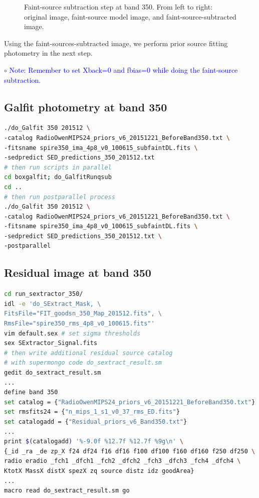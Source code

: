 \documentclass[11pt,a4paper]{article}
\begin{document}
\begin{figure}[H]
	\caption{Faint-source subtraction step at band 350. From left to right: original image, faint-source model image, and faint-source-subtracted image.}
\end{figure}

Using the faint-sources-subtracted image, we perform prior source fitting photometry in the next step. 

\indent\hspace{15pt}$\circ$ 
\textcolor{blue}{Note: Remember to set Xback=0 and fbias=0 while doing the faint-source subtraction.}
\\

\subsection{Galfit photometry at band 350}
\label{Band350_Galfit}

\begin{lstlisting}[language=bash]
./do_Galfit 350 201512 \
-catalog RadioOwenMIPS24_priors_v6_20151221_BeforeBand350.txt \
-fitsname spire350_ima_4p8_v0_100615_subfaintDL.fits \
-sedpredict SED_predictions_350_201512.txt
# then run scripts in parallel 
cd boxgalfit; do_GalfitRunqsub
cd ..
# then run postparallel process
./do_Galfit 350 201512 \
-catalog RadioOwenMIPS24_priors_v6_20151221_BeforeBand350.txt \
-fitsname spire350_ima_4p8_v0_100615_subfaintDL.fits \
-sedpredict SED_predictions_350_201512.txt \
-postparallel
\end{lstlisting}

\subsection{Residual image at band 350}
\label{Band350_Galres}

\begin{lstlisting}[language=bash]
cd run_sextractor_350/
idl -e 'do_SExtract_Mask, \
FitsFile="FIT_goodsn_350_Map_201512.fits", \
RmsFile="spire350_rms_4p8_v0_100615.fits"'
vim default.sex # set sigma thresholds
sex SExtractor_Signal.fits
# then write additional residual source catalog
# with supermongo code do_sextract_result.sm
gedit do_sextract_result.sm
...
define band 350
set catalog = {"RadioOwenMIPS24_priors_v6_20151221_BeforeBand350.txt"}
set rmsfits24 = {"n_mips_1_s1_v0_37_rms_ED.fits"}
set catalogadd = {"Residual_priors_v6_Band350.txt"}
...
print $(catalogadd) '%-9.0f %12.7f %12.7f %9g\n' \
{_id _ra _de zp_X f24 df24 f16 df16 f100 df100 f160 df160 f250 df250 \
radio eradio _fch1 _dfch1 _fch2 _dfch2 _fch3 _dfch3 _fch4 _dfch4 \
KtotX MassX distX spezX zq source distz idz goodArea}
...
macro read do_sextract_result.sm go
\end{lstlisting}
\end{document}
